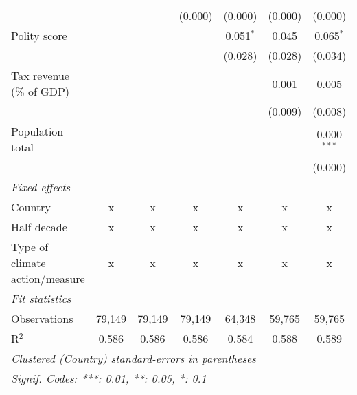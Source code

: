 \begin{tabular}{lcccccc}
                                                                                 &              &               & (0.000)       & (0.000)        & (0.000)        & (0.000)\\   
   Polity score                                                                  &              &               &               & 0.051$^{*}$    & 0.045          & 0.065$^{*}$\\   
                                                                                 &              &               &               & (0.028)        & (0.028)        & (0.034)\\   
   Tax revenue (\% of GDP)                                                       &              &               &               &                & 0.001          & 0.005\\   
                                                                                 &              &               &               &                & (0.009)        & (0.008)\\   
   Population total                                                              &              &               &               &                &                & 0.000$^{***}$\\   
                                                                                 &              &               &               &                &                & (0.000)\\   
   \emph{Fixed effects}\\
   Country                                                                       & x            & x             & x             & x              & x              & x\\  
   Half decade                                                                   & x            & x             & x             & x              & x              & x\\  
   Type of climate action/measure                                                & x            & x             & x             & x              & x              & x\\  
   \midrule \emph{Fit statistics}\\
   Observations                                                                  & 79,149       & 79,149        & 79,149        & 64,348         & 59,765         & 59,765\\  
   R$^2$                                                                         & 0.586        & 0.586         & 0.586         & 0.584          & 0.588          & 0.589\\  
   \midrule
   \multicolumn{7}{l}{\emph{Clustered (Country) standard-errors in parentheses}}\\
   \multicolumn{7}{l}{\emph{Signif. Codes: ***: 0.01, **: 0.05, *: 0.1}}\\
\end{tabular}
\par\endgroup


